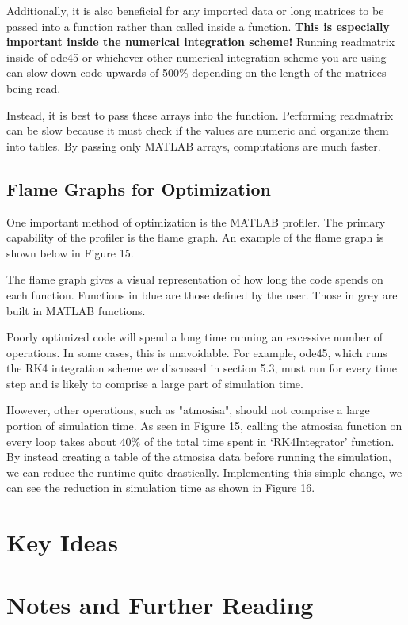 \documentclass[12pt]{report}
\begin{document}
{Additionally, it is also beneficial for any imported data or long matrices to be passed into a function rather than called inside a function. \textbf{This is especially important inside the numerical integration scheme! }Running readmatrix inside of ode45 or whichever other numerical integration scheme you are using can slow down code upwards of 500\% depending on the length of the matrices being read.

Instead, it is best to pass these arrays into the function. Performing readmatrix can be slow because it must check if the values are numeric and organize them into tables. By passing only MATLAB arrays, computations are much faster.
\subsection{Flame Graphs for Optimization}
One important method of optimization is the MATLAB profiler. The primary capability of the profiler is the flame graph. An example of the flame graph is shown below in Figure 15.

The flame graph gives a visual representation of how long the code spends on each function. Functions in blue are those defined by the user. Those in grey are built in MATLAB functions.

Poorly optimized code will spend a long time running an excessive number of operations. In some cases, this is unavoidable. For example, ode45, which runs the RK4 integration scheme we discussed in section 5.3, must run for every time step and is likely to comprise a large part of simulation time.

However, other operations, such as "atmosisa", should not comprise a large portion of simulation time. As seen in Figure 15, calling the atmosisa function on every loop takes about 40\% of the total time spent in ‘RK4Integrator’ function. By instead creating a table of the atmosisa data before running the simulation, we can reduce the runtime quite drastically. Implementing this simple change, we can see the reduction in simulation time as shown in Figure 16.


\section{Key Ideas}

\section{Notes and Further Reading}

}
\end{document}
